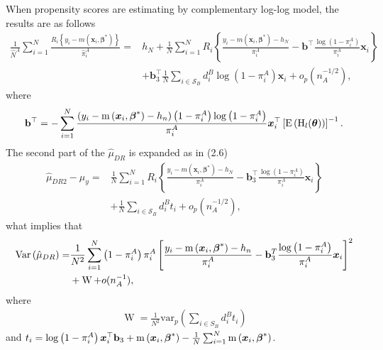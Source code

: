 \documentclass[
  letterpaper,
  DIV=11,
  numbers=noendperiod]{scrreprt}
\begin{document}
When propensity scores are estimating by complementary log-log model,
the results are as follows \[
\begin{equation}
\begin{aligned}
\frac{1}{\hat{N}^A} \sum_{i=1}^N \frac{R_i\left\{y_i-m\left(\boldsymbol{x}_i, \boldsymbol{\beta}^*\right)\right\}}{\hat{\pi}_i^A} = & h_N+\frac{1}{N} \sum_{i=1}^N R_i\left\{\frac{y_i-m\left(\boldsymbol{x}_i, \boldsymbol{\beta}^*\right)-h_N}{\pi_i^A}-\mathbf{b}^{\top} \frac{\log \left(1 - \pi_i^A\right)}{\pi_i^A} \boldsymbol{x}_i\right\} \\
& +\mathbf{b}_3^{\top} \frac{1}{N} \sum_{i \in \mathcal{S}_B} d_i^B \log \left(1 - \pi_i^A\right) \boldsymbol{x}_i+o_p\left(n_A^{-1 / 2}\right),
\end{aligned}
\end{equation}
\] where
\[\mathbf{b}^{\top} = -\sum_{i=1}^N \frac{\left(y_i - \operatorname{m}\left(\boldsymbol{x}_i,\boldsymbol{\beta}^*\right) - h_n\right)\left(1 - \pi_i^A\right) \log \left(1 - \pi_i^A\right)}{\pi_i^A}\boldsymbol{x}_i^{\top}\left[\operatorname{E}\left(\operatorname{H}_{l}(\boldsymbol{\theta})\right)\right]^{-1}.\]
The second part of the \(\hat{\mu}_{DR}\) is expanded as in (2.6) \[
\begin{equation}
\begin{aligned}
\hat{\mu}_{D R 2}-\mu_y = & \frac{1}{N} \sum_{i=1}^N R_i\left\{\frac{y_i-m\left(\boldsymbol{x}_i, \boldsymbol{\beta}^*\right)-h_N}{\pi_i^A}-\mathbf{b}_3^{\top} \frac{\log \left(1 - \pi_i^A\right)}{\pi_i^A} \boldsymbol{x}_i\right\} \\
& +\frac{1}{N} \sum_{i \in \mathcal{S}_B} d_i^B t_i +o_p\left(n_A^{-1 / 2}\right),
\end{aligned}
\end{equation}
\] what implies that \[
\begin{equation*}
    \begin{aligned}
        \operatorname{Var}\left(\hat{\mu}_{DR}\right) = & \frac{1}{N^2} \sum_{i=1}^N \left(1 - \pi_i^A\right)\pi_i^A \left[\frac{y_i - \operatorname{m}\left(\bx_i,\bbeta^*\right) - h_n}{\pi_i^A} - \mathbf{b}_3^T \frac{\log\left(1 - \pi_i^A\right)}{\pi_i^A}\bx_i\right]^2 \\ & + 
        \operatorname{W} + o(n_A^{-1}),
    \end{aligned}
\end{equation*}
\] where \[
\begin{align} 
    \operatorname{W} = \frac{1}{N^2}\text{var}_p\left(\sum_{i \in S_B} d_i^B t_i\right)
\end{align}
\] and
\(t_i = \log \left(1 - \pi_i^A \right) \boldsymbol{x}_i^{\top} \mathbf{b}_3 + \operatorname{m}\left(\boldsymbol{x}_i,\boldsymbol{\beta}^*\right)- \frac{1}{N} \sum_{i=1}^N \operatorname{m}\left(\boldsymbol{x}_i,\boldsymbol{\beta}^*\right)\).
\end{document}
